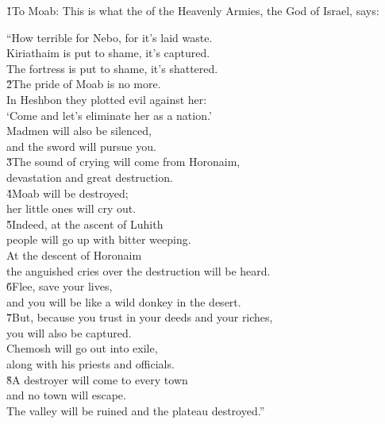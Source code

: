 \v{1}To Moab: This is what the  of the Heavenly Armies, the God of Israel, says:

\begin{poetry}
\poeml ``How terrible for Nebo, for it's laid waste. \\
\poemll    Kiriathaim is put to shame, it's captured. \\
\poemlll       The fortress is put to shame, it's shattered. \\
\poeml \v{2}The pride of Moab is no more. \\
\poemll    In Heshbon they plotted evil against her: \\
\poeml `Come and let's eliminate her as a nation.' \\
\poemll    Madmen will also be silenced, \\
\poemlll       and the sword will pursue you. \\
\poeml \v{3}The sound of crying will come from Horonaim, \\
\poemll    devastation and great destruction. \\
\poeml \v{4}Moab will be destroyed; \\
\poemll    her little ones will cry out. \\
\poeml \v{5}Indeed, at the ascent of Luhith \\
\poemll    people will go up with bitter weeping. \\
\poeml At the descent of Horonaim \\
\poemll    the anguished cries over the destruction will be heard. \\
\poeml \v{6}Flee, save your lives, \\
\poemll    and you will be like a wild donkey in the desert. \\
\poeml \v{7}But, because you trust in your deeds and your riches, \\
\poemll    you will also be captured. \\
\poeml Chemosh will go out into exile, \\
\poemll    along with his priests and officials. \\
\poeml \v{8}A destroyer will come to every town \\
\poemll    and no town will escape. \\
\poeml The valley will be ruined and the plateau destroyed.'' \\

\end{poetry}
